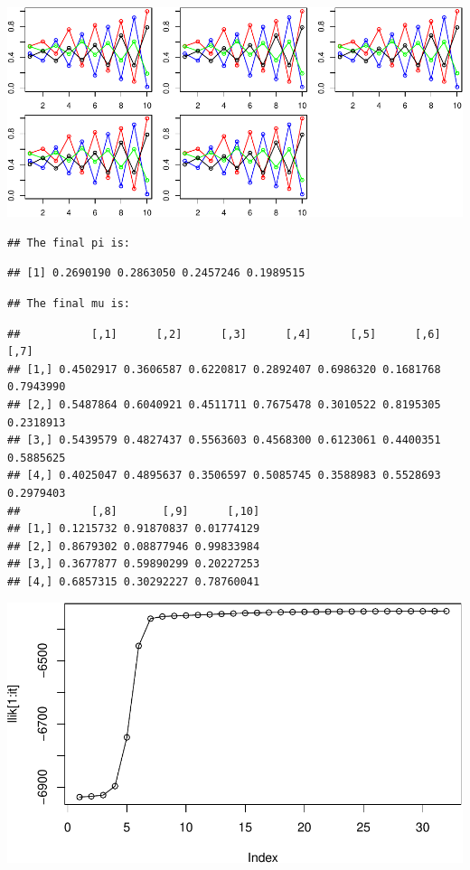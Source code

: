 \documentclass[
]{article}
\begin{document}
\includegraphics{MLLab1block2-lepeng_files/figure-latex/Assignment2_7-4.pdf}

\begin{verbatim}
## The final pi is:
\end{verbatim}

\begin{verbatim}
## [1] 0.2690190 0.2863050 0.2457246 0.1989515
\end{verbatim}

\begin{verbatim}
## The final mu is:
\end{verbatim}

\begin{verbatim}
##           [,1]      [,2]      [,3]      [,4]      [,5]      [,6]      [,7]
## [1,] 0.4502917 0.3606587 0.6220817 0.2892407 0.6986320 0.1681768 0.7943990
## [2,] 0.5487864 0.6040921 0.4511711 0.7675478 0.3010522 0.8195305 0.2318913
## [3,] 0.5439579 0.4827437 0.5563603 0.4568300 0.6123061 0.4400351 0.5885625
## [4,] 0.4025047 0.4895637 0.3506597 0.5085745 0.3588983 0.5528693 0.2979403
##           [,8]       [,9]      [,10]
## [1,] 0.1215732 0.91870837 0.01774129
## [2,] 0.8679302 0.08877946 0.99833984
## [3,] 0.3677877 0.59890299 0.20227253
## [4,] 0.6857315 0.30292227 0.78760041
\end{verbatim}

\includegraphics{MLLab1block2-lepeng_files/figure-latex/Assignment2_8-1.pdf}
\end{document}
